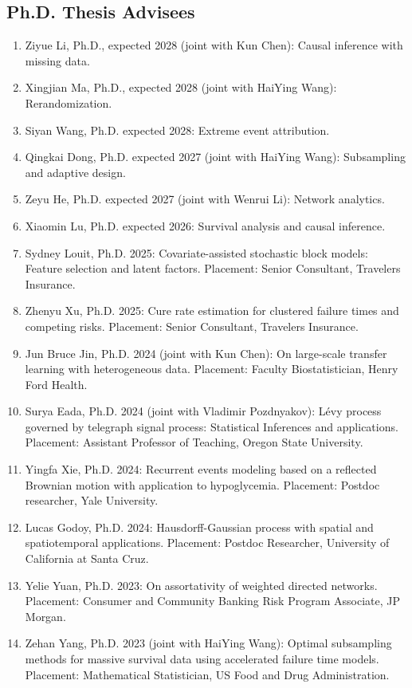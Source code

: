 \documentclass[Statistics]{vita}
\begin{document}
\begin{vita}
    \subsection{Ph.D. Thesis Advisees}
    \begin{enumerate}
    \item Ziyue Li, Ph.D., expected 2028 (joint with Kun Chen): Causal inference with missing data.
    \item Xingjian Ma, Ph.D., expected 2028 (joint with HaiYing Wang): Rerandomization.
    \item Siyan Wang, Ph.D. expected 2028: Extreme event attribution.
    \item Qingkai Dong, Ph.D. expected 2027 (joint with HaiYing Wang): Subsampling and adaptive design.
    \item Zeyu He, Ph.D. expected 2027 (joint with Wenrui Li): Network analytics.
    \item Xiaomin Lu, Ph.D. expected 2026: Survival analysis and causal inference.
    \item Sydney Louit, Ph.D. 2025: Covariate-assisted stochastic block models: Feature selection and latent factors. Placement: Senior Consultant, Travelers Insurance.
    \item Zhenyu Xu, Ph.D. 2025: Cure rate estimation for clustered failure times and competing risks. Placement: Senior Consultant, Travelers Insurance.
    \item Jun Bruce Jin, Ph.D. 2024 (joint with Kun Chen): On large-scale transfer learning with heterogeneous data. Placement: Faculty Biostatistician, Henry Ford Health.
    \item Surya Eada, Ph.D. 2024 (joint with Vladimir Pozdnyakov): L\'evy process governed by telegraph signal process: Statistical Inferences and applications. Placement: Assistant Professor of Teaching, Oregon State University.
    \item Yingfa Xie, Ph.D. 2024: Recurrent events modeling based on a reflected Brownian motion with application to hypoglycemia. Placement: Postdoc researcher, Yale University.
    \item Lucas Godoy, Ph.D. 2024: Hausdorff-Gaussian process with spatial and spatiotemporal applications. Placement: Postdoc Researcher, University of California at Santa Cruz.
    \item Yelie Yuan, Ph.D. 2023: On assortativity of weighted directed networks. Placement: Consumer and Community Banking Risk Program Associate,  JP Morgan.
    \item Zehan Yang, Ph.D. 2023 (joint with HaiYing Wang): Optimal subsampling methods for massive survival data using accelerated failure time models. Placement: Mathematical Statistician, US Food and Drug Administration.

\end{enumerate}
\end{vita}
\end{document}
